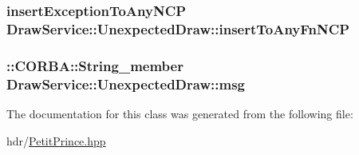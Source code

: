 \subsubsection[{\texorpdfstring{insert\+To\+Any\+Fn\+N\+CP}{insertToAnyFnNCP}}]{ insert\+Exception\+To\+Any\+N\+CP Draw\+Service\+::\+Unexpected\+Draw\+::insert\+To\+Any\+Fn\+N\+CP\hspace{0.3cm}{\ttfamily [static]}}\hypertarget{class_draw_service_1_1_unexpected_draw_ad2cb451677a167ec2cf37ad5a4527831}{}\label{class_draw_service_1_1_unexpected_draw_ad2cb451677a167ec2cf37ad5a4527831}
\subsubsection[{\texorpdfstring{msg}{msg}}]{\setlength{\rightskip}{0pt plus 5cm}\+::C\+O\+R\+B\+A\+::\+String\+\_\+member Draw\+Service\+::\+Unexpected\+Draw\+::msg}\hypertarget{class_draw_service_1_1_unexpected_draw_a50b800e0cd7cf856795cef5bc7f3559e}{}\label{class_draw_service_1_1_unexpected_draw_a50b800e0cd7cf856795cef5bc7f3559e}


The documentation for this class was generated from the following file\+:\begin{DoxyCompactItemize}
\item 
hdr/\hyperlink{_petit_prince_8hpp}{Petit\+Prince.\+hpp}\end{DoxyCompactItemize}
